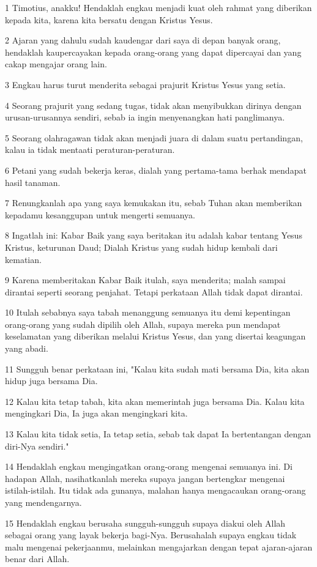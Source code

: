 \par 1 Timotius, anakku! Hendaklah engkau menjadi kuat oleh rahmat yang diberikan kepada kita, karena kita bersatu dengan Kristus Yesus.
\par 2 Ajaran yang dahulu sudah kaudengar dari saya di depan banyak orang, hendaklah kaupercayakan kepada orang-orang yang dapat dipercayai dan yang cakap mengajar orang lain.
\par 3 Engkau harus turut menderita sebagai prajurit Kristus Yesus yang setia.
\par 4 Seorang prajurit yang sedang tugas, tidak akan menyibukkan dirinya dengan urusan-urusannya sendiri, sebab ia ingin menyenangkan hati panglimanya.
\par 5 Seorang olahragawan tidak akan menjadi juara di dalam suatu pertandingan, kalau ia tidak mentaati peraturan-peraturan.
\par 6 Petani yang sudah bekerja keras, dialah yang pertama-tama berhak mendapat hasil tanaman.
\par 7 Renungkanlah apa yang saya kemukakan itu, sebab Tuhan akan memberikan kepadamu kesanggupan untuk mengerti semuanya.
\par 8 Ingatlah ini: Kabar Baik yang saya beritakan itu adalah kabar tentang Yesus Kristus, keturunan Daud; Dialah Kristus yang sudah hidup kembali dari kematian.
\par 9 Karena memberitakan Kabar Baik itulah, saya menderita; malah sampai dirantai seperti seorang penjahat. Tetapi perkataan Allah tidak dapat dirantai.
\par 10 Itulah sebabnya saya tabah menanggung semuanya itu demi kepentingan orang-orang yang sudah dipilih oleh Allah, supaya mereka pun mendapat keselamatan yang diberikan melalui Kristus Yesus, dan yang disertai keagungan yang abadi.
\par 11 Sungguh benar perkataan ini, "Kalau kita sudah mati bersama Dia, kita akan hidup juga bersama Dia.
\par 12 Kalau kita tetap tabah, kita akan memerintah juga bersama Dia. Kalau kita mengingkari Dia, Ia juga akan mengingkari kita.
\par 13 Kalau kita tidak setia, Ia tetap setia, sebab tak dapat Ia bertentangan dengan diri-Nya sendiri."
\par 14 Hendaklah engkau mengingatkan orang-orang mengenai semuanya ini. Di hadapan Allah, nasihatkanlah mereka supaya jangan bertengkar mengenai istilah-istilah. Itu tidak ada gunanya, malahan hanya mengacaukan orang-orang yang mendengarnya.
\par 15 Hendaklah engkau berusaha sungguh-sungguh supaya diakui oleh Allah sebagai orang yang layak bekerja bagi-Nya. Berusahalah supaya engkau tidak malu mengenai pekerjaanmu, melainkan mengajarkan dengan tepat ajaran-ajaran benar dari Allah.
